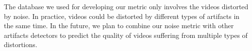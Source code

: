 \documentclass{sig-alternate}
\begin{document}
The database we used for developing our metric only involves the videos distorted by noise. In practice, videos could be distorted by different types of artifacts in the same time. In the future, we plan to combine our noise metric with other artifacts detectors to predict the quality of videos suffering from multiple types of distortions. 

%

%
%
\end{document}
